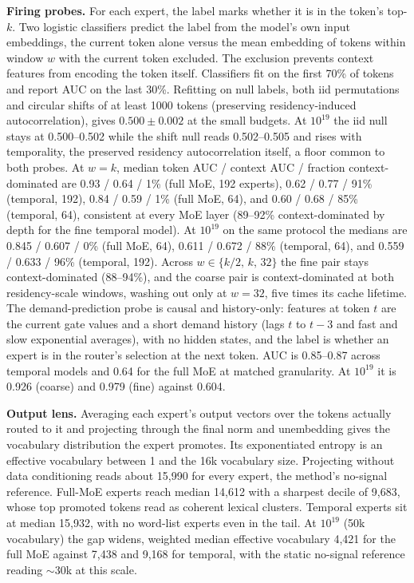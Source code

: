 \documentclass{article}
\begin{document}
\textbf{Firing probes.} For each expert, the label marks whether it is in the token's top-$k$.
Two logistic classifiers predict the label from the model's own input embeddings, the current
token alone versus the mean embedding of tokens within window $w$ with the current token
excluded. The exclusion prevents context features from encoding the token itself. Classifiers
fit on the first 70\% of tokens and report AUC on the last 30\%. Refitting on null labels, both
iid permutations and circular shifts of at least 1000 tokens (preserving residency-induced
autocorrelation), gives $0.500 \pm 0.002$ at the small budgets. At $10^{19}$ the iid null stays
at 0.500--0.502 while the shift null reads 0.502--0.505 and rises with temporality, the
preserved residency autocorrelation itself, a floor common to both probes. At $w = k$, median token AUC / context AUC
/ fraction context-dominated are 0.93 / 0.64 / 1\% (full MoE, 192 experts), 0.62 / 0.77 / 91\%
(temporal, 192), 0.84 / 0.59 / 1\% (full MoE, 64), and 0.60 / 0.68 / 85\% (temporal, 64),
consistent at every MoE layer (89--92\% context-dominated by depth for the fine temporal model).
At $10^{19}$ on the same protocol the medians are 0.845 / 0.607 / 0\% (full MoE, 64), 0.611 /
0.672 / 88\% (temporal, 64), and 0.559 / 0.633 / 96\% (temporal, 192).
Across $w \in \{k/2,\, k,\, 32\}$ the fine pair stays context-dominated (88--94\%), and the
coarse pair is context-dominated at both residency-scale windows, washing out only at $w = 32$,
five times its cache lifetime. The demand-prediction probe is causal and history-only: features
at token $t$ are the current gate values and a short demand history (lags $t$ to $t{-}3$ and
fast and slow exponential averages), with no hidden states, and the label is whether an expert
is in the router's selection at the next token. AUC is 0.85--0.87 across temporal models and
0.64 for the full MoE at matched granularity. At $10^{19}$ it is 0.926 (coarse) and 0.979
(fine) against 0.604.

\textbf{Output lens.} Averaging each expert's output vectors over the tokens actually routed to
it and projecting through the final norm and unembedding gives the vocabulary distribution the
expert promotes. Its exponentiated entropy is an effective vocabulary between 1 and the 16k
vocabulary size. Projecting without data conditioning reads about 15{,}990 for every expert, the
method's no-signal reference. Full-MoE experts reach median 14{,}612 with a sharpest decile of
9{,}683, whose top promoted tokens read as coherent lexical clusters. Temporal experts sit at
median 15{,}932, with no word-list experts even in the tail. At $10^{19}$ (50k vocabulary) the
gap widens, weighted median effective vocabulary 4{,}421 for the full MoE against 7{,}438 and
9{,}168 for temporal, with the static no-signal reference reading $\sim$30k at this scale.
\end{document}
